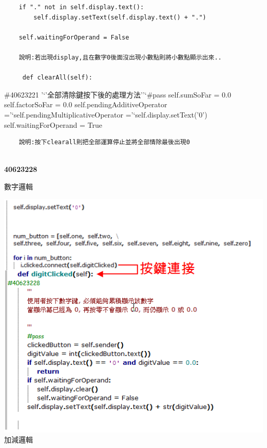 \documentclass[12pt,,]{report}
\begin{document}
\begin{verbatim}
    if "." not in self.display.text():
        self.display.setText(self.display.text() + ".")

    self.waitingForOperand = False
    
    說明:若出現display,且在數字0後面沒出現小數點則將小數點顯示出來..
    
     def clearAll(self):
\end{verbatim}

\#40623221 '`'全部清除鍵按下後的處理方法''`\#pass self.sumSoFar = 0.0
self.factorSoFar = 0.0 self.pendingAdditiveOperator
='`self.pendingMultiplicativeOperator ='`self.display.setText('0')
self.waitingForOperand = True

\begin{verbatim}
    說明:按下clearall則把全部運算停止並將全部情除最後出現0
    
\end{verbatim}

\textbf{40623228}

數字邏輯

\includegraphics{./tex2pdf.2656/c2fc0212c0c1eb6e23fcceb61c5c33768d3624f8.png}
加減邏輯
\end{document}
